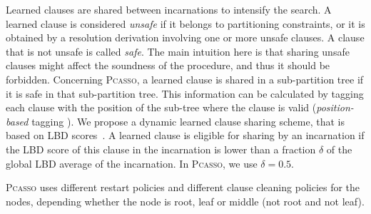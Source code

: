 \documentclass[conference]{IEEEtran}
\newcommand{\1}{x_1}
\newcommand{\2}{x_2}
\newcommand{\3}{x_3}
\newcommand{\4}{x_4}
\newcommand{\5}{x_5}
\newcommand{\6}{x_6}
\newcommand{\7}{x_7}
\newcommand{\8}{x_8}
\newcommand{\9}{x_9}
\newcommand{\pcasso}{\textsc{Pcasso}\xspace}
\newcommand{\splitter}{\textsc{Splitter}\xspace}
\begin{document}
Learned clauses are shared between incarnations to intensify the search.
A learned clause is considered \emph{unsafe} if it belongs to partitioning constraints, or it is obtained by a resolution derivation involving one or more unsafe clauses. A clause that is not unsafe is called \emph{safe}. 
The main intuition here is that sharing unsafe clauses might affect the soundness of the procedure, and thus it should be forbidden. 
Concerning \pcasso, a learned clause is shared in a sub-partition tree if it is safe in that sub-partition tree.
This information can be calculated by tagging each clause with the position of the sub-tree where the clause is valid (\emph{position-based} tagging \cite{davide}).
We propose a dynamic learned clause sharing scheme, that is based on LBD scores~\cite{AS09}.
A learned clause is eligible for sharing by an incarnation if the LBD score of this clause in the incarnation is lower than a fraction $\delta$ of the global LBD average of the incarnation.
In \pcasso, we use $\delta=0.5$.

\pcasso uses different restart policies and different clause cleaning policies for the nodes, depending whether the node is root, leaf or middle (not root and not leaf). 
\end{document}
